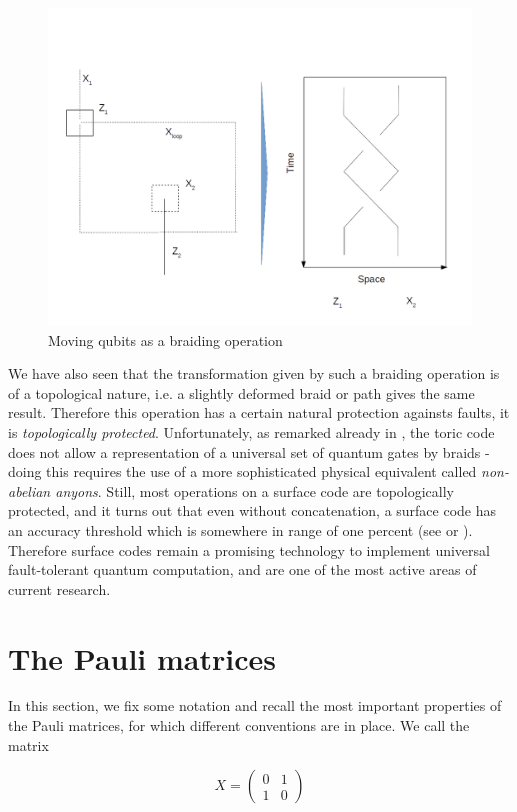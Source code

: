 \documentclass[a4paper, draft]{article}
\theoremstyle{own}
\theoremstyle{remark}
\begin{document}
\begin{figure}[ht]
\centering
\includegraphics[width=0.7\linewidth]{images/Braids}
\caption[Moving qubits as a braiding operation]{Moving qubits as a braiding operation}
\label{fig:Braids}
\end{figure}

We have also seen that the transformation given by such a braiding operation is of a topological nature, i.e. a slightly deformed braid or path gives the same result. Therefore this operation has a certain natural protection againsts faults, it is \emph{topologically protected}. Unfortunately, as remarked already in \cite{Kitaev}, the toric code does not allow a representation of a universal set of quantum gates by braids - doing this requires the use of a more sophisticated physical equivalent called \emph{non-abelian anyons}. Still, most operations on a surface code are topologically protected, and it turns out that even without concatenation, a surface code has an accuracy threshold which is somewhere in range of one percent (see \cite{DKLP} or \cite{SurfaceCodes}). Therefore surface codes remain a promising technology to implement universal fault-tolerant quantum computation, and are one of the most active areas of current research. 

\appendix


\section{The Pauli matrices}

In this section, we fix some notation and recall the most important properties of the Pauli matrices, for which different conventions are in place. We call the matrix

$$
X = \begin{pmatrix} 0 & 1 \\ 1 & 0\end{pmatrix}
$$
\end{document}
